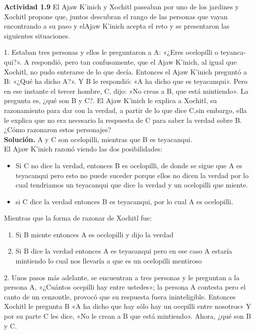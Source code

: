 \textbf{Actividad 1.9}
El Ajaw K’inich y Xochitl paseaban por uno de los jardines y Xochitl propone que, juntos descubran el rango de las personas que vayan encontrando a su paso y elAjaw K’inich acepta el reto y se presentaron las siguientes situaciones.

1. Estaban tres personas y ellos le preguntaron a A: «¿Eres ocelopilli o teyanca-qui?». A respondió, pero tan confusamente, que el Ajaw K’inich, al igual que Xochitl, no pudo enterarse de lo que decía. Entonces el Ajaw K’inich preguntó a B: «¿Qué ha dicho A?». Y B le respondió: «A ha dicho que es teyacanqui». Pero en ese instante el tercer hombre, C, dijo: «No creas a B, que está mintiendo». La pregunta es, ¿qué son B y C?. El Ajaw K’inich le explica a Xochitl, su razonamiento para dar con la verdad, a partir de lo que dice C,sin embargo, ella le explica que no era necesario la respuesta de C para saber la verdad sobre B. ¿Cómo razonaron estos personajes?
\\
\textbf{Solución.} A y C son ocelopilli, mientras que B es teyacanqui.\\

El Ajaw K'inich razonó viendo las dos posibilidades:
\begin{itemize}
    \item Si C no dice la verdad, entonces B es ocelopilli, de donde se sigue que A es teyacanqui pero esto no puede suceder porque ellos no dicen la verdad por lo cual tendriamos un teyacanqui que dice la verdad y un ocelopilli que miente.
    \item si C dice la verdad entonces B es teyacanqui, por lo cual A es ocelopilli. 
\end{itemize}

Mientras que la forma de razonar de Xochitl fue:
\begin{enumerate}
    \item Si B miente entonces A es ocelopilli y dijo la verdad
    \item Si B dice la verdad entonces A es teyacanqui pero en ese caso A estaría mintiendo lo cual nos llevaría a que es un ocelopilli mentiroso
\end{enumerate}

2. Unos pasos más adelante, se encuentran a tres personas y le preguntan a la persona A, «¿Cuántos ocepilli hay entre ustedes»; la persona A contesta pero el canto de un cenzontle, provocó que su respuesta fuera ininteligible. Entonces Xochitl le pregunta B «A ha dicho que hay sólo hay un ocepilli entre nosotros» Y por su parte C les dice, «No le crean a B que está mintiendo». Ahora, ¿qué son B y C.

